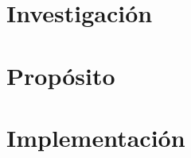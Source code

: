 \documentclass[a4paper,12pt]{article}
\begin{document}
\section*{Investigación}

\section*{Propósito}

\section*{Implementación}



\newpage %
\thispagestyle{fancyref}
\printbibliography %
\end{document}
